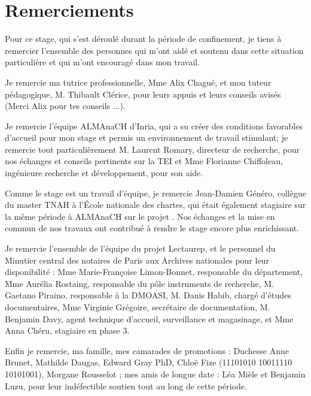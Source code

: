 \chapter*{Remerciements}

Pour ce stage, qui s'est déroulé durant la période de confinement, je tiens à remercier l'ensemble des personnes qui m'ont aidé et soutenu dans cette situation particulière et qui m'ont encouragé dans mon travail.

Je remercie ma tutrice professionnelle, Mme Alix Chagué, et mon tuteur pédagogique, M. Thibault Clérice, pour leurs appuis et leurs conseils avisés (Merci Alix pour tes conseils ...).

Je remercie l'équipe ALMAnaCH d'Inria, qui a su créer des conditions favorables d'accueil pour mon stage et permis un environnement de travail stimulant; je remercie tout particulièrement M. Laurent Romary, directeur de recherche, pour nos échanges et conseils pertinents sur la TEI et Mme Florianne Chiffoleau, ingénieure recherche et développement, pour son aide.

Comme le stage est un travail d'équipe, je remercie Jean-Damien Généro, collègue du master TNAH à l'École nationale des chartes, qui était également stagiaire sur la même période à ALMAnaCH sur le projet . Nos échanges et la mise en commun de nos travaux ont contribué à rendre le stage encore plus enrichissant.

Je remercie l'ensemble de l'équipe du projet Lectaurep, et le personnel du Minutier central des notaires de Paris aux Archives nationales pour leur disponibilité : Mme Marie-Françoise Limon-Bonnet, responsable du département, Mme Aurélia Rostaing, responsable du pôle instruments de recherche, M. Gaetano Piraino, responsable à la DMOASI, M. Danis Habib, chargé d'études documentaires, Mme Virginie Grégoire, secrétaire de documentation, M. Benjamin Davy, agent technique d'accueil, surveillance et magasinage, et Mme Anna Chéru, stagiaire en phase 3. 

Enfin je remercie, ma famille, mes camarades de promotions : Duchesse Anne Brunet, Mathilde Daugas, Edward Gray PhD, Chloë Fize (11101010 10011110 10101001), Morgane Rousselot ; mes amis de longue date : Léa Mièle et Benjamin Luzu, pour leur indéfectible soutien tout au long de cette période. 
\newpage
\thispagestyle{empty}